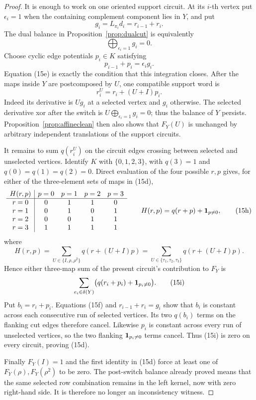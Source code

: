 \documentclass[11pt]{article}
\theoremstyle{definition}
\theoremstyle{remark}
\begin{document}
\begin{proof}
It is enough to work on one oriented support circuit.  At its \(i\)-th
vertex put \(\epsilon_i=1\) when the containing complement component lies
in \(Y\), and put
\[
                    g_i=L_{\pi_i}d_i=r_{i-1}+r_i.
\]
The dual balance in Proposition~\ref{prop:dualcut} is equivalently
\[
                         \bigoplus_{\epsilon_i=1}g_i=0.  \tag{15e}
\]
Choose cyclic edge potentials \(p_i\in K\) satisfying
\[
                         p_{i-1}+p_i=\epsilon_i g_i.     \tag{15f}
\]
Equation (15e) is exactly the condition that this integration closes.
After the maps inside \(Y\) are postcomposed by \(U\), one compatible
support word is
\[
                         r_i^U=r_i+(U+I)p_i.             \tag{15g}
\]
Indeed its derivative is \(Ug_i\) at a selected vertex and \(g_i\)
otherwise.  The selected derivative xor after the switch is
\(U\bigoplus_{\epsilon_i=1}g_i=0\); thus the balance of \(Y\) persists.
Proposition~\ref{prop:affineclean} then also shows that \(F_Y(U)\) is
unchanged by arbitrary independent translations of the support circuits.

It remains to sum \(q(r_i^U)\) on the circuit edges crossing between
selected and unselected vertices.  Identify \(K\) with
\(\{0,1,2,3\}\), with \(q(3)=1\) and \(q(0)=q(1)=q(2)=0\).  Direct
evaluation of the four possible \(r,p\) gives, for either of the
three-element sets of maps in (15d),
\[
\begin{array}{c|cccc}
H(r,p)&p=0&p=1&p=2&p=3\\ \hline
r=0&0&1&1&0\\
r=1&0&1&0&1\\
r=2&0&0&1&1\\
r=3&1&1&1&1
\end{array}
\qquad
H(r,p)=q(r+p)+{\bf1}_{p\ne0},                            \tag{15h}
\]
where
\[
 H(r,p)=\sum_{U\in\{I,\rho,\rho^2\}}q(r+(U+I)p)
       =\sum_{U\in\{\tau_1,\tau_2,\tau_3\}}q(r+(U+I)p).
\]
Hence either three-map sum of the present circuit's contribution to
\(F_Y\) is
\[
 \sum_{e_i\in\delta(Y)}
       \bigl(q(r_i+p_i)+{\bf1}_{p_i\ne0}\bigr).           \tag{15i}
\]
Put \(b_i=r_i+p_i\).  Equations (15f) and
\(r_{i-1}+r_i=g_i\) show that \(b_i\) is constant across each consecutive
run of selected vertices.  Its two \(q(b_i)\) terms on the flanking cut
edges therefore cancel.  Likewise \(p_i\) is constant across every run of
unselected vertices, so the two flanking
\({\bf1}_{p_i\ne0}\) terms cancel.  Thus (15i) is zero on every circuit,
proving (15d).

Finally \(F_Y(I)=1\) and the first identity in (15d) force at least one of
\(F_Y(\rho),F_Y(\rho^2)\) to be zero.  The post-switch balance already
proved means that the same selected row combination remains in the left
kernel, now with zero right-hand side.  It is therefore no longer an
inconsistency witness.
\end{proof}
\end{document}
